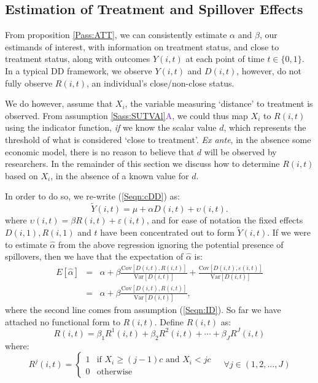 \documentclass{article}
\newcommand{\asref}[2]{\ref{#1}{\textcolor{BlueViolet}{#2}}}
\newcommand{\Var}{\mathrm{Var}}
\newcommand{\Cov}{\mathrm{Cov}}
\newcommand{\Bias}[2]{\frac{\Cov[#1,#2]}{\Var[#1]}}
\begin{document}
\begin{spacing}{1.1}
\subsection{Estimation of Treatment and Spillover Effects}
From proposition \ref{Pass:ATT}, we can consistently estimate $\alpha$
and $\beta$, our estimands of interest, with information on treatment
status, and close to treatment status, along with outcomes $Y(i,t)$ at
each point of time $t\in\{0,1\}$.  In a typical DD framework, we
observe $Y(i,t)$ and $D(i,t)$, however, do not fully observe $R(i,t)$,
an individual's close/non-close status.

We do however, assume that $X_i$, the variable measuring `distance' to
treatment is observed.  From assumption \asref{Sass:SUTVAl}{A}, we could
thus map $X_i$ to $R(i,t)$ using the indicator function, \emph{if} we
know the scalar value $d$, which represents the threshold of what is
considered `close to treatment'.  \emph{Ex ante}, in the absence some
economic model, there is no reason to believe that $d$ will be
observed by researchers.  In the remainder of this section we discuss
how to determine $R(i,t)$ based on $X_i$, in the absence of a known
value for $d$.

In order to do so, we re-write (\ref{Seqn:cDD}) as:
\begin{equation}
\label{Seqn:cDDconc}
\tilde{Y}(i,t)=\mu + \alpha D(i,t) + \upsilon(i,t).
\end{equation}
where $\upsilon(i,t)=\beta R(i,t)+\varepsilon(i,t)$, and for ease of notation
the fixed effects $D(i,1), R(i,1)$ and $t$ have been concentrated out to form
$\tilde{Y}(i,t)$.  If we were to estimate $\hat\alpha$ from the above regression
ignoring the potential presence of spillovers, then we have that the 
expectation of $\hat\alpha$ is:
\begin{eqnarray}
\label{Seqn:alphaExp}
E[\hat\alpha] &=& \alpha + \beta\Bias{D(i,t)}{R(i,t)}+\Bias{D(i,t)}{\varepsilon(i,t)} \nonumber \\ 
              &=& \alpha + \beta\Bias{D(i,t)}{R(i,t)},
\end{eqnarray}
where the second line comes from assumption (\ref{Seqn:ID}).  So far we have
attached no functional form to $R(i,t)$.  Define $R(i,t)$ as:
\begin{equation}
R(i,t) = \beta_1R^1(i,t)+\beta_2R^2(i,t)+ \cdots + \beta_JR^J(i,t)
\end{equation}  
where:
\begin{equation}
 R^j(i,t) =
  \begin{cases}
   1   & \text{if\ \ } X_i\geq(j-1)c \text{\ \ and \ } X_i<jc \\
   0   & \text{otherwise} 
  \end{cases}\ \ \ \ \ \forall j \in (1,2,\ldots,J)
\end{equation}



\end{spacing}
\end{document}
